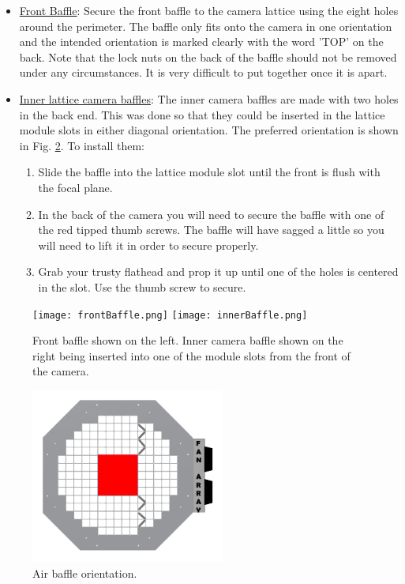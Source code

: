 \documentclass[11pt]{article}
\begin{document}
\begin{itemize}
	\item \underline{Front Baffle}: Secure the front baffle to the camera lattice using the eight holes around the perimeter.
		The baffle only fits onto the camera in one orientation and the intended orientation is marked clearly with the word 'TOP' on the back.
		Note that the lock nuts on the back of the baffle should not be removed under any circumstances.
		It is very difficult to put together once it is apart.

	\item \underline{Inner lattice camera baffles}:  The inner camera baffles are made with two holes in the back end.  
		This was done so that they could be inserted in the lattice module slots in either diagonal orientation.  
		The preferred orientation is shown in Fig. \ref{bafflePic}.  To install them:
		\begin{enumerate} 
			\item Slide the baffle into the lattice module slot until the front is flush with the focal plane.
			\item In the back of the camera you will need to secure the baffle with one of the red tipped thumb screws. 
				The baffle will have sagged a little so you will need to lift it in order to secure properly.
			\item Grab your trusty flathead and prop it up until one of the holes is centered in the slot.
				Use the thumb screw to secure.
		\end{enumerate}
\end{itemize}


\begin{figure}[h]
\begin{center}
\texttt{[image: frontBaffle.png]}
\texttt{[image: innerBaffle.png]}
\caption{Front baffle shown on the left. Inner camera baffle shown on the right being inserted into one of the module slots from the front of the camera. }  
\label{bafflePic2}
\end{center}
\end{figure}


\begin{figure}[h]
\begin{center}
\includegraphics[width = 2.5in]{baffles.png}
\caption{Air baffle orientation.}  
\label{bafflePic}
\end{center}
\end{figure}
\end{document}
